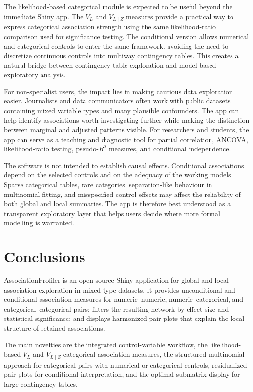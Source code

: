 \documentclass[preprint,12pt,a4paper]{elsarticle}
\begin{document}
The likelihood-based categorical module is expected to be useful beyond the immediate Shiny app. The $V_L$ and $V_{L\mid Z}$ measures provide a practical way to express categorical association strength using the same likelihood-ratio comparison used for significance testing. The conditional version allows numerical and categorical controls to enter the same framework, avoiding the need to discretize continuous controls into multiway contingency tables. This creates a natural bridge between contingency-table exploration and model-based exploratory analysis.

For non-specialist users, the impact lies in making cautious data exploration easier. Journalists and data communicators often work with public datasets containing mixed variable types and many plausible confounders. The app can help identify associations worth investigating further while making the distinction between marginal and adjusted patterns visible. For researchers and students, the app can serve as a teaching and diagnostic tool for partial correlation, ANCOVA, likelihood-ratio testing, pseudo-$R^2$ measures, and conditional independence.

The software is not intended to establish causal effects. Conditional associations depend on the selected controls and on the adequacy of the working models. Sparse categorical tables, rare categories, separation-like behaviour in multinomial fitting, and misspecified control effects may affect the reliability of both global and local summaries. The app is therefore best understood as a transparent exploratory layer that helps users decide where more formal modelling is warranted.

\section{Conclusions}

AssociationProfiler is an open-source Shiny application for global and local association exploration in mixed-type datasets. It provides unconditional and conditional association measures for numeric--numeric, numeric--categorical, and categorical--categorical pairs; filters the resulting network by effect size and statistical significance; and displays harmonized pair plots that explain the local structure of retained associations.

The main novelties are the integrated control-variable workflow, the likelihood-based $V_L$ and $V_{L\mid Z}$ categorical association measures, the structured multinomial approach for categorical pairs with numerical or categorical controls, residualized pair plots for conditional interpretation, and the optimal submatrix display for large contingency tables.
\end{document}
